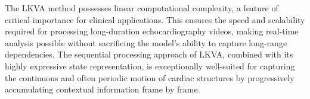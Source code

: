 The LKVA method possesses linear computational complexity, a feature of critical importance for clinical applications. This ensures the speed and scalability required for processing long-duration echocardiography videos, making real-time analysis possible without sacrificing the model's ability to capture long-range dependencies. The sequential processing approach of LKVA, combined with its highly expressive state representation, is exceptionally well-suited for capturing the continuous and often periodic motion of cardiac structures by progressively accumulating contextual information frame by frame. 
